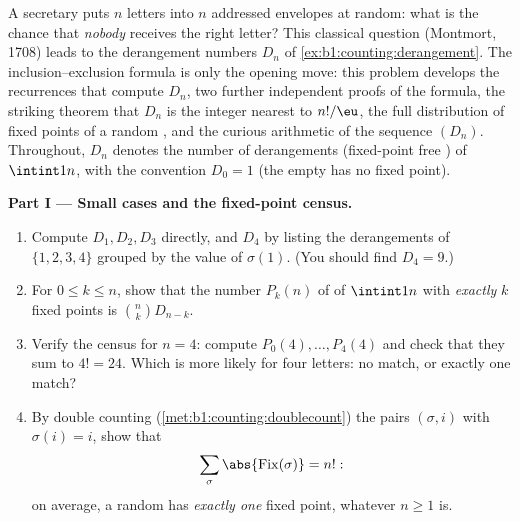 \begin{problem}\label{pb:b1:counting:1}
A secretary puts $n$ letters into $n$ addressed envelopes at random:
what is the chance that \emph{nobody} receives the right letter?
This classical question (Montmort, 1708) leads to the derangement
numbers $D_n$ of \cref{ex:b1:counting:derangement}. The
inclusion--exclusion formula is only the opening move: this problem
develops the recurrences that compute $D_n$, two further independent
proofs of the formula, the striking theorem that $D_n$ is the
integer nearest to $n!/\eu$, the full distribution of fixed points
of a random , and the curious arithmetic of the sequence
$(D_n)$.
Throughout, $D_n$ denotes the number of derangements (fixed-point
free ) of $\intint1n$, with the convention $D_0 = 1$
(the empty  has no fixed point).

\medskip
\noindent\textbf{Part I --- Small cases and the fixed-point
census.}
\begin{enumerate}
  \item Compute $D_1, D_2, D_3$ directly, and $D_4$ by listing the
        derangements of $\{1, 2, 3, 4\}$ grouped by the value of
        $\sigma(1)$. (You should find $D_4 = 9$.)
  \item For $0 \leq k \leq n$, show that the number $P_k(n)$ of
         of $\intint1n$ with \emph{exactly} $k$ fixed
        points is $\binom nk D_{n-k}$.
  \item Verify the census for $n = 4$: compute $P_0(4), \dots,
        P_4(4)$ and check that they sum to $4! = 24$. Which is more
        likely for four letters: no match, or exactly one match?
  \item By double counting (\cref{met:b1:counting:doublecount})
        the pairs $(\sigma, i)$ with $\sigma(i) = i$, show that
        \[
        \sum_{\sigma} \abs{\mathrm{Fix}(\sigma)} = n! :
        \]
        on average, a random  has \emph{exactly one}
        fixed point, whatever $n \geq 1$ is.
\end{enumerate}


\end{problem}
